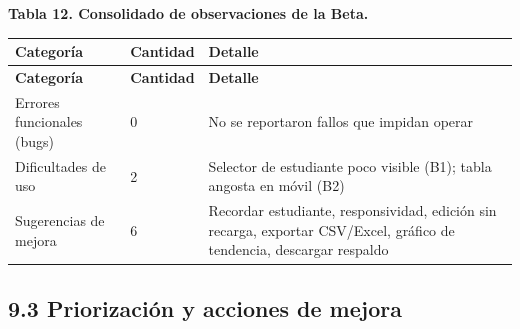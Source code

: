 \documentclass[11pt,a4paper]{article}
\begin{document}
\textbf{Tabla 12. Consolidado de observaciones de la Beta.}


{\small
\begin{longtable}{|p{}|p{}|p{}|}
\rowcolor{UTECblue}\color{white}\bfseries Categoría & \color{white}\bfseries Cantidad & \color{white}\bfseries Detalle \\ \hline
\endfirsthead
\rowcolor{UTECblue}\color{white}\bfseries Categoría & \color{white}\bfseries Cantidad & \color{white}\bfseries Detalle \\ \hline
\endhead
Errores funcionales (bugs) & 0 & No se reportaron fallos que impidan operar \\ \hline
Dificultades de uso & 2 & Selector de estudiante poco visible (B1); tabla angosta en móvil (B2) \\ \hline
Sugerencias de mejora & 6 & Recordar estudiante, responsividad, edición sin recarga, exportar CSV/Excel, gráfico de tendencia, descargar respaldo \\ \hline
\end{longtable}}


\subsection*{9.3 Priorización y acciones de mejora}
\end{document}
